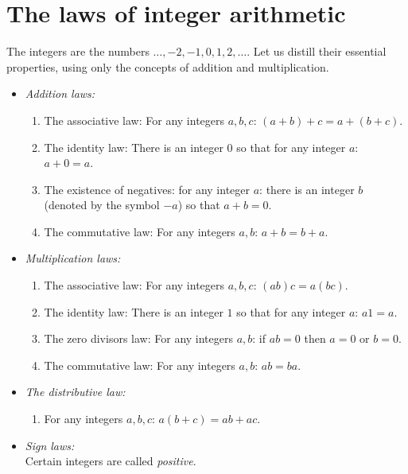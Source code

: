 \section{The laws of integer arithmetic}
The integers are the numbers \(\dots, -2, -1, 0, 1, 2, \dots\).
Let us distill their essential properties, using only the concepts of addition and multiplication.
\smallskip
\begin{itemize}
\item[]\emph{Addition laws:}
\begin{enumerate}
\item The associative law: For any integers \(a, b, c\): \((a+b)+c=a+(b+c)\).
\item The identity law: There is an integer \(0\) so that for any integer \(a\): \(a+0=a\).
\item The existence of negatives: for any integer \(a\): there is an integer \(b\) (denoted by the symbol \(-a\)) so that \(a+b=0\).
\item The commutative law: For any integers \(a, b\): \(a+b=b+a\).
\end{enumerate}
\smallskip
\item[]\emph{Multiplication laws:}
\begin{enumerate}
\item The associative law: For any integers \(a, b, c\): \((ab)c=a(bc)\).
\item The identity law: There is an integer \(1\) so that for any integer \(a\): \(a1=a\).
\item The zero divisors law: For any integers \(a,b\): if \(ab=0\) then \(a=0\) or \(b=0\).
\item The commutative law: For any integers \(a, b\): \(ab=ba\).
\end{enumerate}
\smallskip
\item[]\emph{The distributive law:}
\begin{enumerate}
\item For any integers \(a, b, c\): \(a(b+c)=ab+ac\).
\end{enumerate}
\smallskip
\item[]\emph{Sign laws:} \smallskip \\ 
Certain integers are called \emph{positive}.

\end{itemize}
